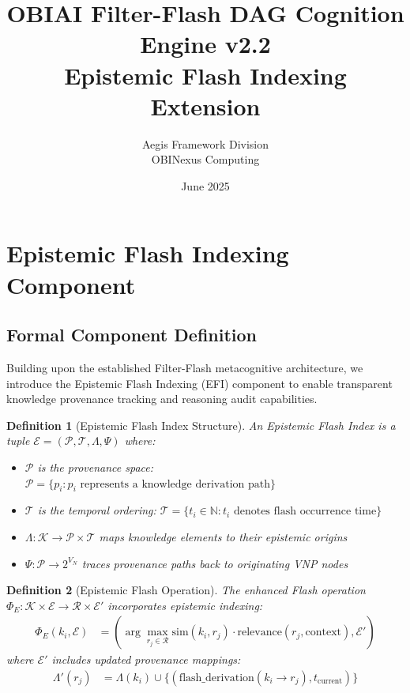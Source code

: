 \documentclass[12pt]{article}
\title{OBIAI Filter-Flash DAG Cognition Engine v2.2\\
Epistemic Flash Indexing Extension}
\author{Aegis Framework Division\\OBINexus Computing}
\date{June 2025}
\newtheorem{definition}{Definition}
\begin{document}
\maketitle

\section{Epistemic Flash Indexing Component}

\subsection{Formal Component Definition}

Building upon the established Filter-Flash metacognitive architecture, we introduce the Epistemic Flash Indexing (EFI) component to enable transparent knowledge provenance tracking and reasoning audit capabilities.

\begin{definition}[Epistemic Flash Index Structure]
An Epistemic Flash Index is a tuple $\mathcal{E} = (\mathcal{P}, \mathcal{T}, \Lambda, \Psi)$ where:
\begin{itemize}
\item $\mathcal{P}$ is the provenance space: $\mathcal{P} = \{p_i : p_i \text{ represents a knowledge derivation path}\}$
\item $\mathcal{T}$ is the temporal ordering: $\mathcal{T} = \{t_i \in \mathbb{N} : t_i \text{ denotes flash occurrence time}\}$
\item $\Lambda: \mathcal{K} \rightarrow \mathcal{P} \times \mathcal{T}$ maps knowledge elements to their epistemic origins
\item $\Psi: \mathcal{P} \rightarrow 2^{V_N}$ traces provenance paths back to originating VNP nodes
\end{itemize}
\end{definition}

\begin{definition}[Epistemic Flash Operation]
The enhanced Flash operation $\Phi_E: \mathcal{K} \times \mathcal{E} \rightarrow \mathcal{R} \times \mathcal{E}'$ incorporates epistemic indexing:
\begin{align}
\Phi_E(k_i, \mathcal{E}) &= \left(\arg\max_{r_j \in \mathcal{R}} \text{sim}(k_i, r_j) \cdot \text{relevance}(r_j, \text{context}), \mathcal{E}'\right)
\end{align}
where $\mathcal{E}'$ includes updated provenance mappings:
\begin{align}
\Lambda'(r_j) &= \Lambda(k_i) \cup \{(\text{flash\_derivation}(k_i \rightarrow r_j), t_{\text{current}})\}
\end{align}
\end{definition}
\end{document}
